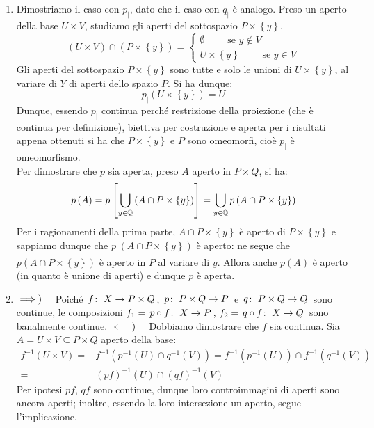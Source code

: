 \begin{demonstration}
\begin{enumerate}[label=\Roman*]
\begin{enumerate}[label=\alph*)]
\end{enumerate}
\item Dimostriamo il caso con $p_{\mid}$, dato che il caso con $q_{\mid}$ è analogo. Preso un aperto della base $U\times V$, studiamo gli aperti del sottospazio $P\times\left\{ y\right\}$.
\begin{equation*}
\left(U\times V\right)\cap \left(P\times\left\{ y\right\}\right)=\begin{cases}
\emptyset\qquad\text{ se }y\notin V\\
U\times\left\{y\right\}\qquad\text{ se }y\in V
\end{cases}
\end{equation*}
Gli aperti del sottospazio $P\times\left\{ y\right\}$ sono tutte e solo le unioni di $U\times\left\{ y\right\}$, al variare di $Y$ di aperti dello spazio $P$. Si ha dunque:
\begin{equation*}
p_{\mid}\left(U\times \left\{y\right\}\right)=U
\end{equation*}
Dunque, essendo $p_{\mid}$ continua perché restrizione della proiezione (che è continua per definizione), biettiva per costruzione e aperta per i risultati appena ottenuti si ha che $P\times\left\{ y\right\}$ e $P$ sono omeomorfi, cioè $p_{\mid}$ è omeomorfismo.\\
Per dimostrare che $p$ sia aperta, preso $A$ aperto in $P\times Q$, si ha:
\begin{equation}
p\left(A\right)=p\left[\mathop{{\bigcup}}\displaylimits_{y\in\mathbb{Q}}\left(A\cap P\times\left\{ y\right\}\right)\right]=\mathop{{\bigcup}}\displaylimits_{y\in\mathbb{Q}}p\left(A\cap P\times\left\{ y\right\}\right)
\end{equation}
Per i ragionamenti della prima parte, $A\cap P\times\left\{ y\right\}$ è aperto di $P\times\left\{ y\right\}$ e sappiamo dunque che $p_{\mid}\left(A\cap P\times\left\{ y\right\}\right)$ è aperto: ne segue che $p\left(A\cap P\times\left\{ y\right\}\right)$ è aperto in $P$ al variare di $y$. Allora anche $p\left(A\right)$ è aperto (in quanto è unione di aperti) e dunque $p$ è aperta.
\item $\implies)\quad$ Poiché $\funz{f}{X}{P\times Q}$, $\funz{p}{P\times Q}{P}$ e $\funz{q}{P\times Q}{Q}$ sono continue, le composizioni $f_1=\funz{p\circ f}{X}{P}$, $f_2=\funz{q\circ f}{X}{Q}$ sono banalmente continue.
$\impliedby)\quad$ Dobbiamo dimostrare che $f$ sia continua. Sia $A=U\times V\subseteq P\times Q$ aperto della base:
\begin{align*}
f^{-1}\left(U\times V\right)=&f^{-1}\left(p^{-1}\left(U\right)\cap q^{-1}\left(V\right)\right)=f^{-1}\left(p^{-1}\left(U\right)\right)\cap f^{-1}\left(q^{-1}\left(V\right)\right) \\
=& \left(pf\right)^{-1}\left(U\right)\cap \left(qf\right)^{-1}\left(V\right)
\end{align*}
Per ipotesi $pf$, $qf$ sono continue, dunque loro controimmagini di aperti sono ancora aperti; inoltre, essendo la loro intersezione un aperto, segue l'implicazione.
\end{enumerate}
\end{demonstration}
